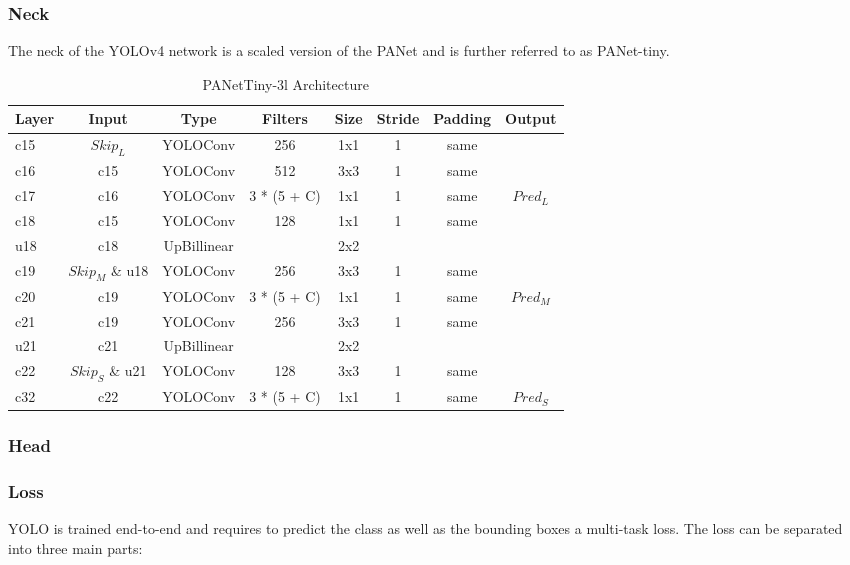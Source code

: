 \subsubsection{Neck}
The neck of the \ac{YOLOv4} network is a scaled version of the \ac{PANet} \cite{pannet} and is further referred to as PANet-tiny.

\begin{table}
\begin{center}

\begin{tabular}{l|c|c|c|c|c|c|c}
    \textbf{Layer} & \textbf{Input} & \textbf{Type} & \textbf{Filters} & \textbf{Size} & \textbf{Stride} & \textbf{Padding} & \textbf{Output} \\
    \hline
    c15 & $Skip_L$ & YOLOConv & 256 & 1x1 & 1 & same\\
    c16 & c15 & YOLOConv & 512 & 3x3 & 1 & same\\
    c17 & c16 & YOLOConv & 3 * (5 + C) & 1x1 & 1 & same & $Pred_L$\\
    c18 & c15 & YOLOConv & 128 & 1x1 & 1 & same \\
    u18 & c18 & UpBillinear & & 2x2 & &\\
    c19 & $Skip_M$ \& u18 & YOLOConv & 256 & 3x3 & 1 & same\\
    c20 & c19 & YOLOConv & 3 * (5 + C) & 1x1 & 1 & same & $Pred_M$\\
    c21 & c19 & YOLOConv & 256 & 3x3 & 1 & same\\
    u21 & c21 & UpBillinear & & 2x2 & &\\
    c22 & $Skip_S$ \& u21 & YOLOConv & 128 & 3x3 & 1 & same\\
    c32 & c22 & YOLOConv & 3 * (5 + C) & 1x1 & 1 & same & $Pred_S$\\
\end{tabular}

\caption{PANetTiny-3l Architecture}
\label{tab:panet_tiny_arch}
\end{center}
\end{table}


\subsubsection{Head}

\subsubsection{Loss}

\ac{YOLO} is trained end-to-end and requires to predict the class as well as the bounding boxes a multi-task loss.
The loss can be separated into three main parts:

